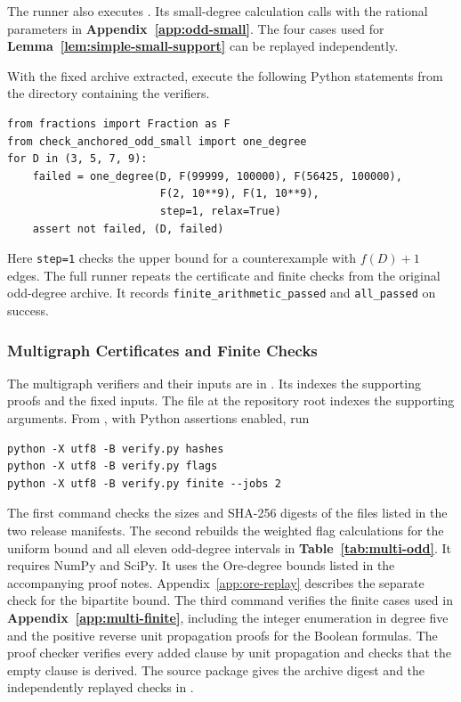 The runner also executes . Its small-degree
calculation calls  with the rational
parameters in \textbf{Appendix~\ref{app:odd-small}}. The four cases
used for \textbf{Lemma~\ref{lem:simple-small-support}} can be replayed
independently.

\noindent\begin{minipage}{\linewidth}
With the fixed archive extracted, execute the following Python statements
from the directory containing the verifiers.
\begin{verbatim}
from fractions import Fraction as F
from check_anchored_odd_small import one_degree
for D in (3, 5, 7, 9):
    failed = one_degree(D, F(99999, 100000), F(56425, 100000),
                        F(2, 10**9), F(1, 10**9),
                        step=1, relax=True)
    assert not failed, (D, failed)
\end{verbatim}
\end{minipage}\par
Here \verb|step=1| checks the upper bound for a counterexample with
$f(D)+1$ edges. The full runner repeats the certificate and finite
checks from the original odd-degree archive. It records
\verb|finite_arithmetic_passed| and \verb|all_passed| on success.

\subsubsection{Multigraph Certificates and Finite Checks}
\label{app:multi-reproduction}

The multigraph verifiers and their inputs are in
.
Its  indexes the supporting proofs and the fixed
inputs. The file  at the repository root
indexes the supporting arguments. From ,
with Python assertions enabled, run
\begin{verbatim}
python -X utf8 -B verify.py hashes
python -X utf8 -B verify.py flags
python -X utf8 -B verify.py finite --jobs 2
\end{verbatim}
The first command checks the sizes and SHA-256 digests of the files
listed in the two release manifests. The second rebuilds
the weighted flag calculations for the uniform bound and all eleven
odd-degree intervals in \textbf{Table~\ref{tab:multi-odd}}.
It requires NumPy and SciPy.
It uses the Ore-degree bounds listed in the accompanying proof notes.
Appendix~\ref{app:ore-replay} describes the separate check for the
bipartite bound.
The third command verifies the finite cases used in
\textbf{Appendix~\ref{app:multi-finite}}, including the integer enumeration in
degree five and the positive reverse unit propagation proofs for the
Boolean formulas. The proof checker verifies every added clause by
unit propagation and checks that the empty clause is derived. The
source package gives the archive digest and the independently replayed
checks in .

